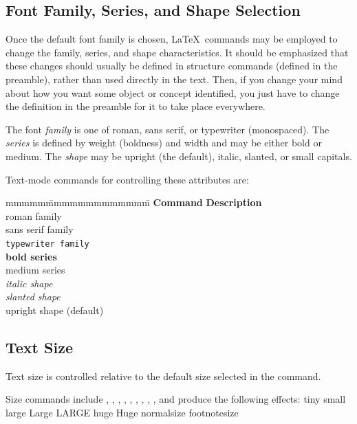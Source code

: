 \subsection{Font Family, Series, and Shape Selection}
\label{ssec.fontfam}
Once the default font family is chosen, \LaTeX\ commands may be employed to change the family, series, and shape characteristics.
It should be emphasized that these changes should usually be defined in structure commands (defined in the preamble), rather than used directly in the text.
Then, if you change your mind about how you want some object or concept identified, you just have to change the definition in the preamble for it to take place everywhere.

The font \emph{family} is one of roman, sans serif, or typewriter (monospaced).
The \emph{series} is defined by weight (boldness) and width and may be either bold or medium.
The \emph{shape} may be upright (the default), italic, slanted, or small capitals.

Text-mode commands for controlling these attributes are:
\begin{tabbing}
mmmmm\=mmmmmmmmmmmmm\= \kill
\>\textbf{Command} \>\textbf{Description} \\
\> \>\textrm{roman family}\\
\> \>\textsf{sans serif family}\\
\> \>\texttt{typewriter family}\\
\> \>\textbf{bold series}\\
\> \>\textmd{medium series}\\
\> \>\textit{italic shape}\\
\> \>\textsl{slanted shape}\\
\> \>\textup{upright shape} (default)
\end{tabbing}
\subsection{Text Size}
Text size is controlled relative to the default size selected in the  command.

Size commands include , , , , , , , , , and produce the following effects: \newline
\tiny{tiny} \small{small} \large{large} \Large{Large} \LARGE{LARGE} \huge{huge} \Huge{Huge} \normalsize{normalsize} \footnotesize{footnotesize} \normalsize
